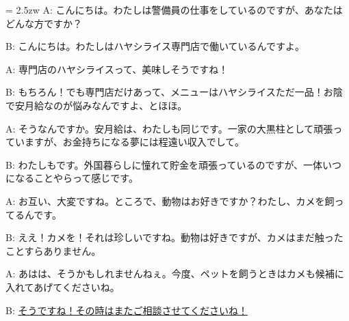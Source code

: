 \documentclass[11pt]{amsart}
\title{}
\author{}
\newenvironment{hangall}[1]{\hangindent = 2.5zw\everypar{\hangindent = 2.5zw}}{}
\begin{document}
\maketitle
\begin{hangall}{}%
A: こんにちは。わたしは警備員の仕事をしているのですが、あなたはどんな方ですか？

B: こんにちは。わたしはハヤシライス専門店で働いているんですよ。

A: 専門店のハヤシライスって、美味しそうですね！

B: もちろん！でも専門店だけあって、メニューはハヤシライスただ一品！お陰で安月給なのが悩みなんですよ、とほほ。

A: そうなんですか。安月給は、わたしも同じです。一家の大黒柱として頑張っていますが、お金持ちになる夢には程遠い収入でして。

B: わたしもです。外国暮らしに憧れて貯金を頑張っているのですが、一体いつになることやらって感じです。

A: お互い、大変ですね。ところで、動物はお好きですか？わたし、カメを飼ってるんです。

B: ええ！カメを！それは珍しいですね。動物は好きですが、カメはまだ触ったことすらありません。

A: あはは、そうかもしれませんねぇ。今度、ペットを飼うときはカメも候補に入れてあげてくださいね。

B: \ul{そうですね！その時はまたご相談させてくださいね！}\end{hangall}
\end{document}
